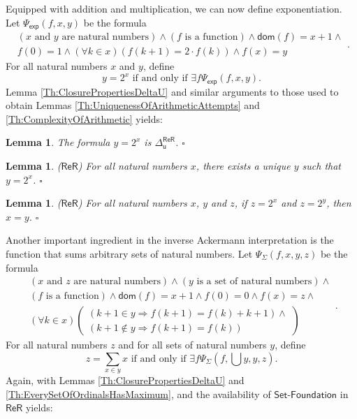 \documentclass[11pt, a4paper]{article}
\newcounter{Prop1}
\newtheorem{lemma}[theorem]{Lemma}
\begin{document}
Equipped with addition and multiplication, we can now define exponentiation. Let $\Psi_{\mathsf{exp}}(f, x, y)$ be the formula
\[
\begin{array}{c}
(x \textrm{ and } y \textrm{ are natural numbers}) \land (f \textrm{ is a function}) \land \mathsf{dom}(f)=x+1 \land\\
f(0)=1 \land (\forall k \in x)(f(k+1)= 2\cdot f(k)) \land f(x)=y
\end{array}. 
\]
For all natural numbers $x$ and $y$, define
\[
y= 2^x \textrm{ if and only if } \exists f \Psi_{\mathsf{exp}}(f, x, y).
\]
Lemma \ref{Th:ClosurePropertiesDeltaU} and similar arguments to those used to obtain Lemmas \ref{Th:UniquenessOfArithmeticAttempts} and \ref{Th:ComplexityOfArithmetic} yields:

\begin{lemma} \label{Th:ComplexityOfPowers}
The formula $y= 2^x$ is $\Delta_{\mathsf{u}}^{\mathsf{ReR}}$. \hfill$\square$ 
\end{lemma}

\begin{lemma} \label{Th:UniquenessOfPowers}
($\mathsf{ReR}$) For all natural numbers $x$, there exists a unique $y$ such that $y= 2^x$. \hfill$\square$
\end{lemma}

\begin{lemma} \label{Th:PowerFunctionInjective}
($\mathsf{ReR}$) For all natural numbers $x$, $y$ and $z$, if $z= 2^x$ and $z=2^y$, then $x=y$. \hfill$\square$
\end{lemma}

Another important ingredient in the inverse Ackermann interpretation is the function that sums arbitrary sets of natural numbers. Let $\Psi_{\Sigma}(f, x, y, z)$ be the formula
\[
\begin{array}{c}
(x \textrm{ and } z \textrm{ are natural numbers}) \land (y \textrm{ is a set of natural numbers}) \land\\
(f \textrm{ is a function}) \land \mathsf{dom}(f)= x+1 \land f(0)= 0 \land f(x)= z \land\\ 
(\forall k \in x)\left( \begin{array}{c}
(k+1 \in y \Rightarrow f(k+1)=f(k)+k+1) \land\\
(k+1 \notin y \Rightarrow f(k+1)=f(k))
\end{array}\right)
\end{array}.
\]
For all natural numbers $z$ and for all sets of natural numbers $y$, define
\[
z= \sum_{x \in y} x \textrm{ if and only if } \exists f \Psi_{\Sigma}\left(f, \bigcup y, y, z\right). 
\]
Again, with Lemmas \ref{Th:ClosurePropertiesDeltaU} and \ref{Th:EverySetOfOrdinalsHasMaximum}, and the availability of $\textsf{Set-Foundation}$ in $\mathsf{ReR}$ yields:
\end{document}
